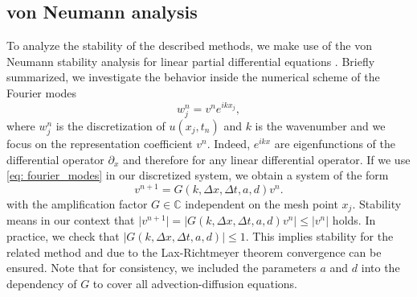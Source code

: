\subsection{von Neumann analysis}
\label{sec: stability_theory_PDE}
To analyze the stability of the described methods, we make use of the von Neumann stability analysis for linear partial differential equations \cite{leveque2007finite}.
Briefly summarized, we investigate the behavior inside the numerical scheme of the Fourier modes
\begin{equation}\label{eq: fourier_modes}
w^n_j = v^ne^{ikx_j},
\end{equation}
where $w^n_j$ is the discretization of $u(x_j, t_n)$ and $k$ is the wavenumber and we focus on the representation coefficient $v^n$. 
Indeed, $e^{ikx}$ are eigenfunctions of the differential operator $\partial_x$ and therefore for any linear differential operator. 
If we use \eqref{eq: fourier_modes} in our discretized system, we obtain a system of the form
\begin{equation}
\label{eq: ampfactor}
v^{n+1}=G(k, \Delta x, \Delta t, a, d)v^n.
\end{equation}
with the amplification factor $G\in \mathbb{C}$ independent on the mesh point $x_j$.
Stability means in our context that $\lvert{v^{n+1}}\rvert= \lvert{G(k, \Delta x, \Delta t, a, d)v^n}\rvert \leq \lvert v^n\rvert$ holds.
In practice, we check that $\lvert G (k, \Delta x, \Delta t, a, d) \rvert \le 1$. This implies stability for the related method and due to the  Lax-Richtmeyer theorem \cite{leveque2007finite} convergence can be ensured.
Note that for consistency, we included the parameters $a$ and $d$ into the dependency of $G$ to cover all advection-diffusion equations. \\
